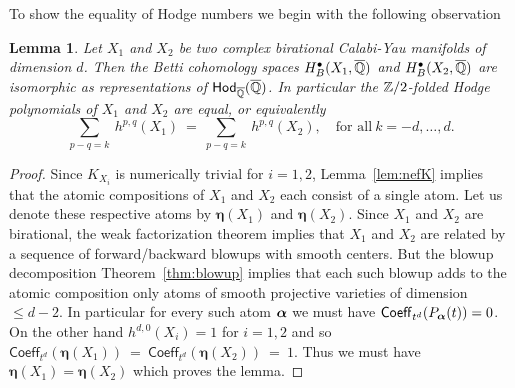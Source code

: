 \documentclass[twoside,leqno]{article}
\numberwithin{equation}{section}
\theoremstyle{plain}
\newtheorem{lemma}[equation]{Lemma}
\theoremstyle{definition}
\begin{document}
To show the equality of Hodge numbers we begin with the following observation



\begin{lemma} \label{lem:birCYatoms}
Let $X_1$ and $X_2$ be two complex birational Calabi-Yau manifolds of dimension $d$. Then the Betti cohomology spaces $H^{\bullet}_{B}(X_1,\overline{\mathbb Q})$ and  $H^{\bullet}_{B}(X_2,\overline{\mathbb Q})$ are isomorphic as representations of $\mathsf{Hod}_{\overline{\mathbb Q}}(\overline{\mathbb Q})$. In particular the 
$\mathbb Z/2$-folded Hodge polynomials of $X_{1}$ and $X_{2}$ are equal, or equivalently  
\[
\sum_{p-q = k} \ h^{p,q}(X_{1}) \ = \ \sum_{p-q = k} \ h^{p,q}(X_{2}), \quad \text{for all} \ k = -d, \ldots, d.
\]
\end{lemma}
\begin{proof}
Since $K_{X_i}$  is numerically trivial  for $i = 1,2$, Lemma~\ref{lem:nefK} implies that the atomic compositions of $X_{1}$ and $X_{2}$ each consist of a single atom. Let us denote these respective atoms by $\boldsymbol{\eta}(X_{1})$ and $\boldsymbol{\eta}(X_{2})$.
Since $X_{1}$ and $X_{2}$ are birational, the weak factorization theorem \cite{Abramovich_Torification_and_factorization} implies that $X_{1}$ and $X_{2}$ are related by a sequence of forward/backward blowups with smooth centers. But the blowup decomposition Theorem~\ref{thm:blowup} implies that each such blowup adds to the atomic composition only atoms of smooth projective varieties of dimension $\leq d- 2$.
In particular for every such atom $\boldsymbol{\alpha}$ we must have $\mathsf{Coeff}_{t^{d}}(P_{\boldsymbol{\alpha}}(t)) = 0$. On the other hand  $h^{d,0}(X_i)=1$ for $i = 1,2$  and so 
$\mathsf{Coeff}_{t^{d}}(\boldsymbol{\eta}(X_{1})) \ = \ \mathsf{Coeff}_{t^{d}}(\boldsymbol{\eta}(X_{2})) \ = \ 1$. Thus we must have $\boldsymbol{\eta}(X_{1}) = \boldsymbol{\eta}(X_{2})$ which proves the lemma. 
\end{proof}
\end{document}
